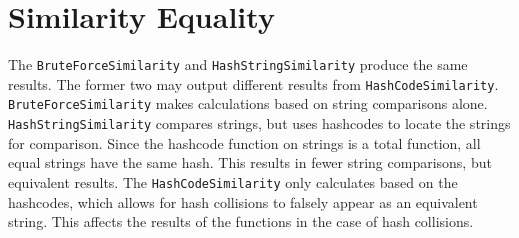 \documentclass[10pt,letterpaper]{article}
\begin{document}
\section{Similarity Equality}
The \texttt{BruteForceSimilarity} and \texttt{HashStringSimilarity} produce the
same results. The former two may output different results from
\texttt{HashCodeSimilarity}. \texttt{BruteForceSimilarity} makes calculations
based on string comparisons alone. \texttt{HashStringSimilarity} compares
strings, but uses hashcodes to locate the strings for comparison. Since the
hashcode function on strings is a total function, all equal strings have the
same hash. This results in fewer string comparisons, but equivalent results. The
\texttt{HashCodeSimilarity} only calculates based on the hashcodes, which allows
for hash collisions to falsely appear as an equivalent string. This affects the
results of the functions in the case of hash collisions.
\end{document}
